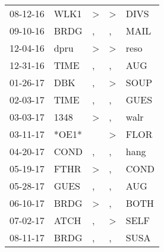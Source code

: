 \begin{supertabular}{p{0.07\textwidth}p{0.06\textwidth}p{0.02\textwidth}p{0.02\textwidth}p{0.06\textwidth}}
          08-12-16\textsuperscript{} &           WLK1\textsuperscript{} &     \textgreater &     \textgreater &           DIVS\textsuperscript{} \\
          09-10-16\textsuperscript{} &           BRDG\textsuperscript{} &                , &                , &           MAIL\textsuperscript{} \\
          12-04-16\textsuperscript{} &           dpru\textsuperscript{} &     \textgreater &     \textgreater &           reso\textsuperscript{} \\
          12-31-16\textsuperscript{} &           TIME\textsuperscript{} &                , &                , &            AUG\textsuperscript{} \\
          01-26-17\textsuperscript{} &            DBK\textsuperscript{} &                , &     \textgreater &           SOUP\textsuperscript{} \\
          02-03-17\textsuperscript{} &           TIME\textsuperscript{} &                , &                , &           GUES\textsuperscript{} \\
          03-03-17\textsuperscript{} &           1348\textsuperscript{} &     \textgreater &                , &           walr\textsuperscript{} \\
          03-11-17\textsuperscript{} &                            *OE1* &                  &     \textgreater &           FLOR\textsuperscript{} \\
          04-20-17\textsuperscript{} &           COND\textsuperscript{} &                , &                , &           hang\textsuperscript{} \\
          05-19-17\textsuperscript{} &           FTHR\textsuperscript{} &     \textgreater &                , &           COND\textsuperscript{} \\
          05-28-17\textsuperscript{} &           GUES\textsuperscript{} &                , &                , &            AUG\textsuperscript{} \\
          06-10-17\textsuperscript{} &           BRDG\textsuperscript{} &     \textgreater &                , &           BOTH\textsuperscript{} \\
          07-02-17\textsuperscript{} &           ATCH\textsuperscript{} &                , &     \textgreater &           SELF\textsuperscript{} \\
          08-11-17\textsuperscript{} &           BRDG\textsuperscript{} &                , &                , &           SUSA\textsuperscript{} \\

\end{supertabular}
